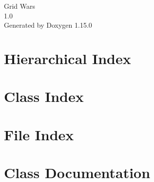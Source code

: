 \documentclass[twoside]{book}
\newcommand{\+}{\discretionary{\mbox{\scriptsize$\hookleftarrow$}}{}{}}
\newcommand{\clearemptydoublepage}{%
    \newpage{\pagestyle{empty}\cleardoublepage}%
  }
\begin{document}
  \raggedbottom
    \hypersetup{pageanchor=false,
                bookmarksnumbered=true,
                pdfencoding=unicode
               }
  \begin{titlepage}
  \vspace*{7cm}
  \begin{center}%
  {\Large Grid Wars}\\
  [1ex]\large 1.\+0 \\
  \vspace*{1cm}
  {\large Generated by Doxygen 1.15.0}\\
  \end{center}
  \end{titlepage}
  \clearemptydoublepage
  \tableofcontents
  \clearemptydoublepage
  \hypersetup{pageanchor=true}
\chapter{Hierarchical Index}

\chapter{Class Index}

\chapter{File Index}

\chapter{Class Documentation}





































\end{document}
